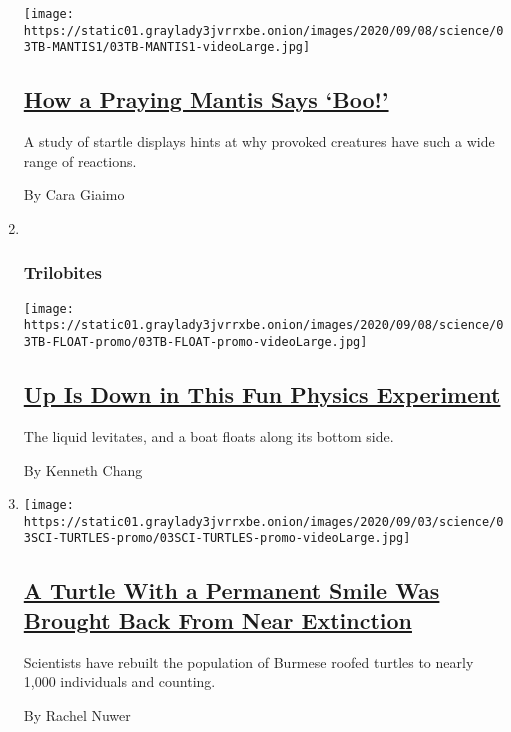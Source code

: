 \begin{enumerate}
  \texttt{[image: https://static01.graylady3jvrrxbe.onion/images/2020/09/08/science/03TB-MANTIS1/03TB-MANTIS1-videoLarge.jpg]}

  \hypertarget{how-a-praying-mantis-says-boo}{%
  \subsection{\texorpdfstring{\href{/2020/09/03/science/praying-mantis-startle.html}{How
  a Praying Mantis Says
  `Boo!'}}{How a Praying Mantis Says `Boo!'}}\label{how-a-praying-mantis-says-boo}}

  A study of startle displays hints at why provoked creatures have such
  a wide range of reactions.

  By Cara Giaimo
\item ~
  \hypertarget{trilobites-4}{%
  \subsubsection{Trilobites}\label{trilobites-4}}

  \texttt{[image: https://static01.graylady3jvrrxbe.onion/images/2020/09/08/science/03TB-FLOAT-promo/03TB-FLOAT-promo-videoLarge.jpg]}

  \hypertarget{up-is-down-in-this-fun-physics-experiment}{%
  \subsection{\texorpdfstring{\href{/2020/09/03/science/floating-upside-down-liquid.html}{Up
  Is Down in This Fun Physics
  Experiment}}{Up Is Down in This Fun Physics Experiment}}\label{up-is-down-in-this-fun-physics-experiment}}

  The liquid levitates, and a boat floats along its bottom side.

  By Kenneth Chang
\item
  \texttt{[image: https://static01.graylady3jvrrxbe.onion/images/2020/09/03/science/03SCI-TURTLES-promo/03SCI-TURTLES-promo-videoLarge.jpg]}

  \hypertarget{a-turtle-with-a-permanent-smile-was-brought-back-from-near-extinction}{%
  \subsection{\texorpdfstring{\href{/2020/09/03/science/burmese-roofed-turtle-myanmar-extinction.html}{A
  Turtle With a Permanent Smile Was Brought Back From Near
  Extinction}}{A Turtle With a Permanent Smile Was Brought Back From Near Extinction}}\label{a-turtle-with-a-permanent-smile-was-brought-back-from-near-extinction}}

  Scientists have rebuilt the population of Burmese roofed turtles to
  nearly 1,000 individuals and counting.

  By Rachel Nuwer
\end{enumerate}

